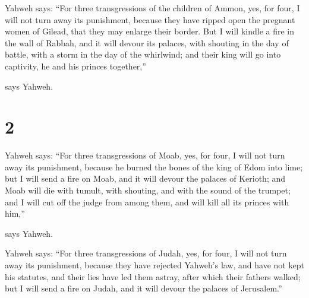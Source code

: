  Yahweh says: ``For three transgressions of the children of
Ammon, yes, for four, I will not turn away its punishment, because they
have ripped open the pregnant women of Gilead, that they may enlarge
their border.  But I will kindle a fire in the wall of
Rabbah, and it will devour its palaces, with shouting in the day of
battle, with a storm in the day of the whirlwind;  and
their king will go into captivity, he and his princes together,''

says Yahweh.

\hypertarget{section-1}{%
\section{2}\label{section-1}}

 Yahweh says: ``For three transgressions of Moab, yes, for
four, I will not turn away its punishment, because he burned the bones
of the king of Edom into lime;  but I will send a fire on
Moab, and it will devour the palaces of Kerioth; and Moab will die with
tumult, with shouting, and with the sound of the trumpet; 
and I will cut off the judge from among them, and will kill all its
princes with him,''

says Yahweh.

 Yahweh says: ``For three transgressions of Judah, yes, for
four, I will not turn away its punishment, because they have rejected
Yahweh's law, and have not kept his statutes, and their lies have led
them astray, after which their fathers walked;  but I will
send a fire on Judah, and it will devour the palaces of Jerusalem.''

